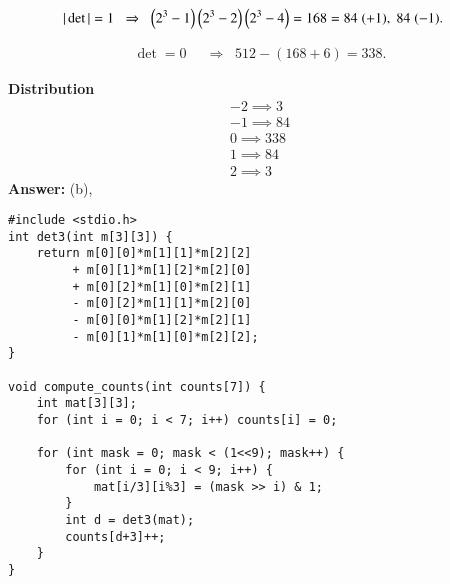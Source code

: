 \documentclass[journal,12pt,onecolumn]{IEEEtran}
\begin{document}
\begin{align}
|\det|=1 &\;\;\Rightarrow\;\;
	\left(2^3-1\right)\left(2^3-2\right)\left(2^3-4\right)=168
=84 \;(+1),\; 84 \;(-1).
\end{align}

\begin{align}
\det=0 &\;\;\Rightarrow\;\; 512-(168+6)=338.
\end{align}

\textbf{ Distribution}
\begin{align}
-2 \implies 3 \\
-1 \implies 84 \\
0 \implies 338 \\
1 \implies 84 \\
2 \implies 3
\end{align}
\textbf{Answer:} (b),
\begin{lstlisting}[caption={C code}]
#include <stdio.h>
int det3(int m[3][3]) {
    return m[0][0]*m[1][1]*m[2][2]
         + m[0][1]*m[1][2]*m[2][0]
         + m[0][2]*m[1][0]*m[2][1]
         - m[0][2]*m[1][1]*m[2][0]
         - m[0][0]*m[1][2]*m[2][1]
         - m[0][1]*m[1][0]*m[2][2];
}

void compute_counts(int counts[7]) {
    int mat[3][3];
    for (int i = 0; i < 7; i++) counts[i] = 0;

    for (int mask = 0; mask < (1<<9); mask++) {
        for (int i = 0; i < 9; i++) {
            mat[i/3][i%3] = (mask >> i) & 1;
        }
        int d = det3(mat);
        counts[d+3]++;
    }
}
\end{lstlisting}
\end{document}
